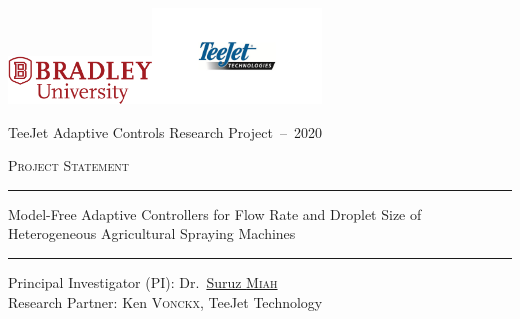 \documentclass[12pt]{article}
\title{\proposalTitle}
\def\grantName{TeeJet Adaptive Controls Research Project~--~2020}
\def\proposalTitle{Model-Free Adaptive Controllers for Flow Rate and Droplet
  Size of Heterogeneous Agricultural Spraying Machines}
\newcommand{\midskip}[0]{\vspace{3mm}}
\begin{document}
\centerline{\href{http://www.bradley.edu}{\includegraphics[height=0.5in]{figs/logoBU1-Print}}\hfill\href{https://www.teejet.com/}{\includegraphics[height=1.0in]{figs/TeeJet-Logo}}}

\begin{center}
\vspace*{1.0cm}
{\LARGE \grantName}


\vspace*{0.25cm}

{\LARGE \textsc{Project Statement}}

\vspace*{0.5cm}

\vspace*{1.5cm}
{\color{BrickRed}
\hrule height 1.5pt
\midskip
}
{\LARGE 
\proposalTitle
}
\midskip
{\color{BrickRed}
\hrule height 1.5pt
\midskip
}
\vspace*{0.01cm}
\begin{flushright}
{\large
 Principal Investigator (PI):  Dr.~\href{http://personalpages.bradley.edu/~smiah}{Suruz \textsc{Miah}}\\
 Research Partner: Ken \textsc{Vonckx}, TeeJet Technology
}
\end{flushright}


\end{center}
\end{document}
